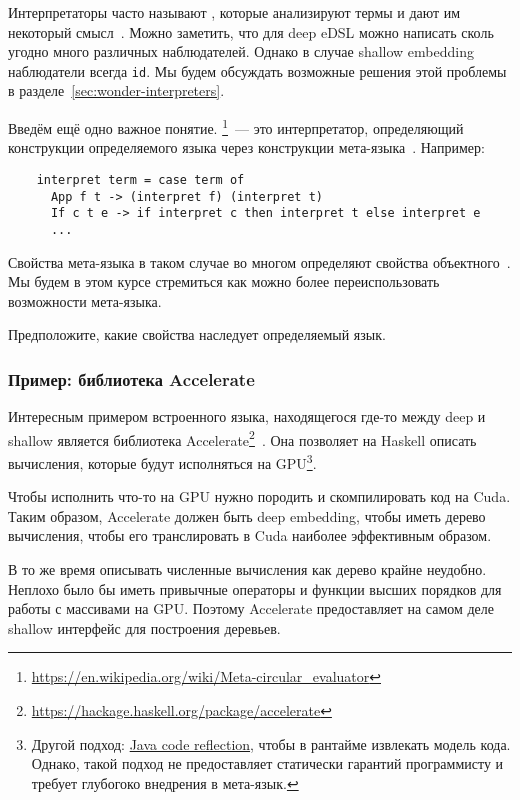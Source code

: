 Интерпретаторы часто называют , которые анализируют термы и дают им некоторый смысл~\cite{gibbons2013functional}.
Можно заметить, что для deep eDSL можно написать сколь угодно много различных наблюдателей.
Однако в случае shallow embedding наблюдатели всегда \texttt{id}.
Мы будем обсуждать возможные решения этой проблемы в разделе~\ref{sec:wonder-interpreters}.

Введём ещё одно важное понятие.
\footnote{\url{https://en.wikipedia.org/wiki/Meta-circular_evaluator}}~--- это интерпретатор, определяющий конструкции определяемого языка через конструкции мета-языка~\cite{reynolds1972definitional}.
Например:
\begin{verbatim}
    interpret term = case term of
      App f t -> (interpret f) (interpret t)
      If c t e -> if interpret c then interpret t else interpret e
      ...
\end{verbatim}

Свойства мета-языка в таком случае во многом определяют свойства объектного~\cite{reynolds1972definitional,reynolds1998definitional}.
Мы будем в этом курсе стремиться как можно более переиспользовать возможности мета-языка.

\begin{task}
    Предположите, какие свойства наследует определяемый язык.
\end{task}

\subsubsection{Пример: библиотека Accelerate}

Интересным примером встроенного языка, находящегося где-то между deep и shallow является библиотека Accelerate\footnote{\url{https://hackage.haskell.org/package/accelerate}}~\cite[глава 6]{marlow2011parallel}.
Она позволяет на Haskell описать вычисления, которые будут исполняться на GPU\footnote{Другой подход: \href{https://youtu.be/6c0DB2kwF_Q?si=-nB7AkCsDWB_Q-hy}{Java code reflection}, чтобы в рантайме извлекать модель кода. Однако, такой подход не предоставляет статически гарантий программисту и требует глубогоко внедрения в мета-язык.}.

Чтобы исполнить что-то на GPU нужно породить и скомпилировать код на Cuda.
Таким образом, Accelerate должен быть deep embedding, чтобы иметь дерево вычисления, чтобы его транслировать в Cuda наиболее эффективным образом.

В то же время описывать численные вычисления как дерево крайне неудобно.
Неплохо было бы иметь привычные операторы и функции высших порядков для работы с массивами на GPU\@.
Поэтому Accelerate предоставляет на самом деле shallow интерфейс для построения деревьев.

